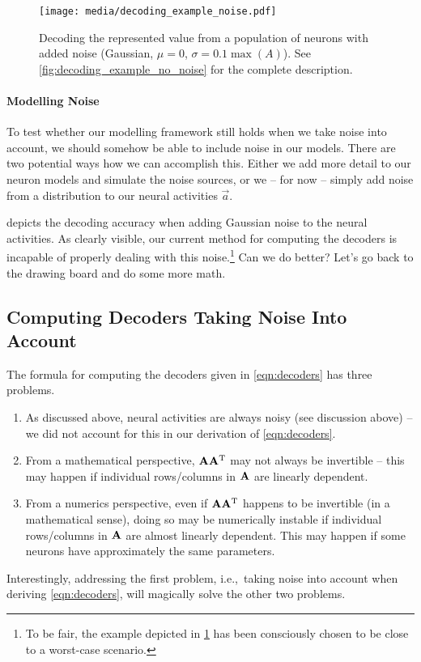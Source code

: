 \documentclass[10pt,letterpaper,oneside]{article}
\begin{document}
\begin{figure}
	\centering
	\texttt{[image: media/decoding\_example\_noise.pdf]}
	\caption{Decoding the represented value from a population of neurons with added noise (Gaussian, $\mu = 0$, $\sigma = 0.1 \max(A)$). See \cref{fig:decoding_example_no_noise} for the complete description. }
	\label{fig:decoding_example_noise}
\end{figure}


\paragraph{Modelling Noise}
To test whether our modelling framework still holds when we take noise into account, we should somehow be able to include noise in our models. There are two potential ways how we can accomplish this. Either we add more detail to our neuron models and simulate the noise sources, or we -- for now -- simply add noise from a distribution to our neural activities $\vec a$.

 depicts the decoding accuracy when adding Gaussian noise to the neural activities. As clearly visible, our current method for computing the decoders is incapable of properly dealing with this noise.\footnote{To be fair, the example depicted in \cref{fig:decoding_example_noise} has been consciously chosen to be close to a worst-case scenario.} Can we do better? Let's go back to the drawing board and do some more math.

\subsection{Computing Decoders Taking Noise Into Account}

The formula for computing the decoders given in \cref{eqn:decoders} has three problems.
\begin{enumerate}[1.]
	\item As discussed above, neural activities are always noisy (see discussion above) -- we did not account for this in our derivation of \cref{eqn:decoders}.
	\item From a mathematical perspective, ${\mathbf{A}} {\mathbf{A}}^{\mathrm{T}}$ may not always be invertible -- this may happen if individual rows/columns in ${\mathbf{A}}$ are linearly dependent.
	\item From a numerics perspective, even if ${\mathbf{A}} {\mathbf{A}}^{\mathrm{T}}$ happens to be invertible (in a mathematical sense), doing so may be numerically instable if individual rows/columns in ${\mathbf{A}}$ are almost linearly dependent. This may happen if some neurons have approximately the same parameters.
\end{enumerate}
Interestingly, addressing the first problem, i.e.,~taking noise into account when deriving \cref{eqn:decoders}, will magically solve the other two problems.
\end{document}
